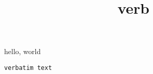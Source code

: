 \documentclass{amsart}
\title{verb}
\begin{document}
\maketitle

hello, world



{\tt\meaning\obeylines}

\verb+verbatim text+
\end{document}
